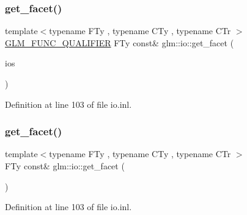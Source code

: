 \mbox{\label{namespaceglm_1_1io_a9e8927cf032254b0eee4ec650286e1f9}} 
\subsubsection{\texorpdfstring{get\+\_\+facet()}{get\_facet()}\hspace{0.1cm}{\footnotesize\ttfamily [1/2]}}
{\footnotesize\ttfamily template$<$typename F\+Ty , typename C\+Ty , typename C\+Tr $>$ \\
\hyperlink{setup_8hpp_a33fdea6f91c5f834105f7415e2a64407}{G\+L\+M\+\_\+\+F\+U\+N\+C\+\_\+\+Q\+U\+A\+L\+I\+F\+I\+ER} F\+Ty const\& glm\+::io\+::get\+\_\+facet (\begin{DoxyParamCaption}\item[{std\+::basic\+\_\+ios$<$ C\+Ty, C\+Tr $>$ \&}]{ios }\end{DoxyParamCaption})}



Definition at line 103 of file io.\+inl.

\mbox{\label{namespaceglm_1_1io_a7ae96c71704bbf3c6e61543a7e731bc4}} 
\subsubsection{\texorpdfstring{get\+\_\+facet()}{get\_facet()}\hspace{0.1cm}{\footnotesize\ttfamily [2/2]}}
{\footnotesize\ttfamily template$<$typename F\+Ty , typename C\+Ty , typename C\+Tr $>$ \\
F\+Ty const\& glm\+::io\+::get\+\_\+facet (\begin{DoxyParamCaption}\item[{std\+::basic\+\_\+ios$<$ C\+Ty, C\+Tr $>$ \&}]{ }\end{DoxyParamCaption})}



Definition at line 103 of file io.\+inl.

\mbox{\label{namespaceglm_1_1io_ac52a8c5f8ea189f5bae2e5b8e382675f}} 
